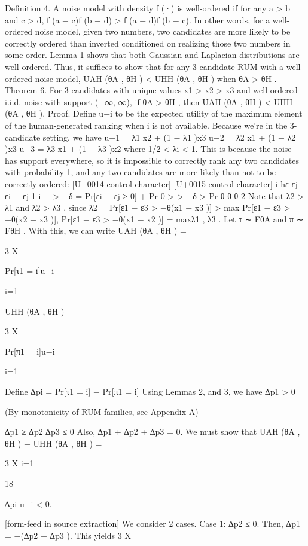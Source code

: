 \documentclass[10pt]{article}
\begin{document}
\begin{ReviewVerbatim}

Definition 4. A noise model with density f (·) is well-ordered if for any a > b and c > d,
f (a − c)f (b − d) > f (a − d)f (b − c).
In other words, for a well-ordered noise model, given two numbers, two candidates are more likely to be
correctly ordered than inverted conditioned on realizing those two numbers in some order. Lemma 1 shows
that both Gaussian and Laplacian distributions are well-ordered.
Thus, it suffices to show that for any 3-candidate RUM with a well-ordered noise model, UAH (θA , θH ) <
UHH (θA , θH ) when θA > θH .
Theorem 6. For 3 candidates with unique values x1 > x2 > x3 and well-ordered i.i.d. noise with support
(−∞, ∞), if θA > θH , then UAH (θA , θH ) < UHH (θA , θH ).
Proof. Define u−i to be the expected utility of the maximum element of the human-generated ranking when
i is not available. Because we’re in the 3-candidate setting, we have
u−1 = λ1 x2 + (1 − λ1 )x3
u−2 = λ2 x1 + (1 − λ2 )x3
u−3 = λ3 x1 + (1 − λ3 )x2
where 1/2 < λi < 1. This is because the noise has support everywhere, so it is impossible to correctly rank
any two candidates with probability 1, and any two candidates are more likely than not to be correctly
ordered:
[U+0014 control character]
[U+0015 control character]
i
hε
εj
εi − εj
1
i
−
> −δ = Pr[εi − εj ≥ 0] + Pr 0 >
> −δ >
Pr
θ
θ
θ
2
Note that λ2 > λ1 and λ2 > λ3 , since
λ2 = Pr[ε1 − ε3 > −θ(x1 − x3 )] > max {Pr[ε1 − ε3 > −θ(x2 − x3 )], Pr[ε1 − ε3 > −θ(x1 − x2 )]} = max{λ1 , λ3 }.
Let τ ∼ FθA and π ∼ FθH . With this, we can write
UAH (θA , θH ) =

3
X

Pr[τ1 = i]u−i

i=1

UHH (θA , θH ) =

3
X

Pr[π1 = i]u−i

i=1

Define
∆pi = Pr[τ1 = i] − Pr[π1 = i]
Using Lemmas 2, and 3, we have
∆p1 > 0

(By monotonicity of RUM families, see Appendix A)

∆p1 ≥ ∆p2
∆p3 ≤ 0
Also, ∆p1 + ∆p2 + ∆p3 = 0. We must show that
UAH (θA , θH ) − UHH (θA , θH ) =

3
X
i=1

18

∆pi u−i < 0.


[form-feed in source extraction]
We consider 2 cases.
Case 1: ∆p2 ≤ 0.
Then, ∆p1 = −(∆p2 + ∆p3 ). This yields
3
X


\end{ReviewVerbatim}
\end{document}

